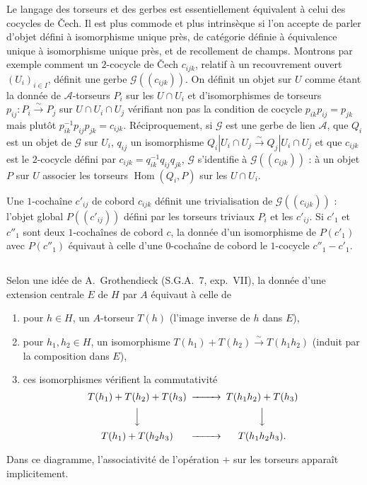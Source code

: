 \documentclass[12pt,a4paper]{article}
\theoremstyle{plain}
\theoremstyle{definition}
\theoremstyle{remark}
\DeclareMathOperator{\Hom}{Hom}
\providecommand{\Hom}{\operatorname{Hom}}
\begin{document}
Le langage des torseurs et des gerbes est essentiellement équivalent à celui des
cocycles de Čech. Il est plus commode et plus intrinsèque si l'on accepte de parler d'objet
défini à isomorphisme unique près, de catégorie définie à équivalence unique à isomorphisme unique près, et de recollement de champs. Montrons par exemple comment
un $2$-cocycle de Čech $c_{ijk}$, relatif à un recouvrement ouvert $(U_i)_{i \in I}$, définit une
gerbe $\mathscr{G}((c_{ijk}))$. On définit un objet sur $U$ comme étant la donnée de $\mathscr{A}$-torseurs $P_i$
sur les $U \cap U_i$ et d'isomorphismes de torseurs $p_{ij} : P_i \xrightarrow{\sim} P_j$ sur $U \cap U_i \cap U_j$ vérifiant
non pas la condition de cocycle $p_{ik} p_{ij} = p_{jk}$ mais plutôt $p_{ik}^{-1} p_{ij} p_{jk} = c_{ijk}$. Réciproquement, si $\mathscr{G}$ est une gerbe de lien $\mathscr{A}$, que $Q_i$ est un objet de $\mathscr{G}$ sur $U_i$, $q_{ij}$ un isomorphisme $Q_i|U_i \cap U_j \xrightarrow{\sim} Q_j|U_i \cap U_j$ et que $c_{ijk}$ est le $2$-cocycle défini par
$c_{ijk} = q_{ik}^{-1} q_{ij} q_{jk}$, $\mathscr{G}$ s'identifie à $\mathscr{G}((c_{ijk}))$ : à un objet $P$ sur $U$ associer les torseurs $\Hom(Q_i, P)$
sur les $U \cap U_i$.

Une $1$-cochaîne $c'_{ij}$ de cobord $c_{ijk}$ définit une trivialisation de $\mathscr{G}((c_{ijk}))$ : l'objet
global $P((c'_{ij}))$ défini par les torseurs triviaux $P_i$ et les $c'_{ij}$. Si $c'_1$ et $c''_1$ sont deux $1$-cochaînes
de cobord $c$, la donnée d'un isomorphisme de $P(c'_1)$ avec $P(c''_1)$ équivaut à celle d'une
$0$-cochaîne de cobord le $1$-cocycle $c''_1 - c'_1$.

\subsection{}

Selon une idée de A.~Grothendieck (S.G.A.~7, exp.~VII), la donnée d'une
extension centrale $E$ de $H$ par $A$ équivaut à celle de
\begin{enumerate}[label=(E\arabic*)]
\item pour $h \in H$, un $A$-torseur $T(h)$ (l'image inverse de $h$ dans $E$),
\item pour $h_1, h_2 \in H$, un isomorphisme $T(h_1) + T(h_2) \xrightarrow{\sim} T(h_1 h_2)$ (induit par la
composition dans $E$),
\item ces isomorphismes vérifient la commutativité
\[
\begin{CD}
T(h_1) + T(h_2) + T(h_3) @>>> T(h_1 h_2) + T(h_3) \\
@VVV @VVV \\
T(h_1) + T(h_2 h_3) @>>> T(h_1 h_2 h_3).
\end{CD}
\]
\end{enumerate}
Dans ce diagramme, l'associativité de l'opération $+$ sur les torseurs apparaît
implicitement.
\end{document}
